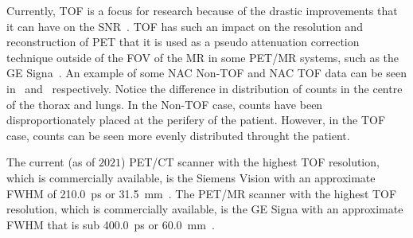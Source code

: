                 Currently, \gls{TOF} is a focus for research because of the drastic improvements that it can have on the \gls{SNR}~\parencite{Lecoq2017, Cates2018}. \gls{TOF} has such an impact on the resolution and reconstruction of \gls{PET} that it is used as a pseudo attenuation correction technique outside of the \gls{FOV} of the \gls{MR} in some \gls{PET}/\gls{MR} systems, such as the \gls{GE} Signa~\parencite{Pan2019}. %
                An example of some \gls{NAC} \gls{Non-TOF} and \gls{NAC} \gls{TOF} data can be seen in~ and~ respectively. Notice the difference in distribution of counts in the centre of the thorax and lungs. In the \gls{Non-TOF} case, counts have been disproportionately placed at the perifery of the patient. However, in the \gls{TOF} case, counts can be seen more evenly distributed throught the patient.
                
                The current (as of $2021$) \gls{PET}/\gls{CT} scanner with the highest \gls{TOF} resolution, which is commercially available, is the Siemens Vision with an approximate \gls{FWHM} of \SI{210.0}{\pico\second} or \SI{31.5}{\milli\metre}~\parencite{VanSluis2019}. The \gls{PET}/\gls{MR} scanner with the highest \gls{TOF} resolution, which is commercially available, is the \gls{GE} Signa with an approximate \gls{FWHM} that is sub \SI{400.0}{\pico\second} or \SI{60.0}{\milli\metre}~\parencite{SIGNA, Hsu2017StudiesSystem, Caribe2019NEMAIsotopes}. %
            
